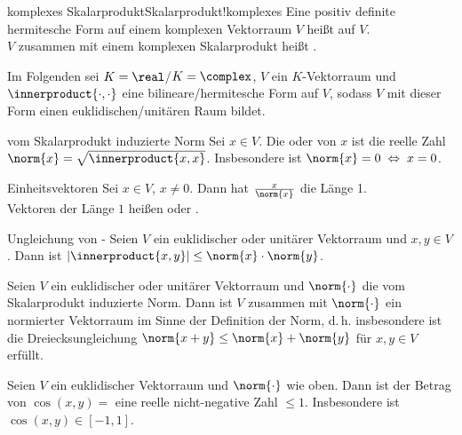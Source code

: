 \begin{xDef}{komplexes Skalarprodukt}{Skalarprodukt!komplexes}
    Eine positiv definite hermitesche Form auf einem komplexen Vektorraum $V$
    heißt 
    auf $V$. \\
    $V$ zusammen mit einem komplexen Skalarprodukt heißt
    .
\end{xDef}

\begin{Bem}
    Im Folgenden sei $K = \real$/$K= \complex$, $V$ ein $K$-Vektorraum
    und $\innerproduct{\cdot, \cdot}$ eine bilineare/hermitesche Form auf $V$,
    sodass $V$ mit dieser Form einen euklidischen/unitären Raum bildet.
\end{Bem}

\begin{Def}{vom Skalarprodukt induzierte Norm}
    Sei $x \in V$.
    Die  oder  von $x$ ist die reelle Zahl
    $\norm{x} = \sqrt{\innerproduct{x, x}}$.
    Insbesondere ist $\norm{x} = 0 \;\Leftrightarrow\; x = 0$.
\end{Def}

\begin{Def}{Einheitsvektoren}
    Sei $x \in V$, $x \not= 0$.
    Dann hat $\frac{x}{\norm{x}}$ die Länge 1. \\
    Vektoren der Länge $1$ heißen  oder
    .
\end{Def}

\begin{Satz}{Ungleichung von -}
    Seien $V$ ein euklidischer oder unitärer Vektorraum und $x, y \in V$.
    Dann ist $|\innerproduct{x, y}| \le \norm{x} \cdot \norm{y}$.
\end{Satz}

\begin{Kor}
    Seien $V$ ein euklidischer oder unitärer Vektorraum und $\norm{\cdot}$
    die vom Skalarprodukt induzierte Norm.
    Dann ist $V$ zusammen mit $\norm{\cdot}$ ein normierter Vektorraum
    im Sinne der Definition der Norm, d.\,h. insbesondere ist
    die Dreiecksungleichung $\norm{x + y} \le \norm{x} + \norm{y}$ für
    $x, y \in V$ erfüllt.
\end{Kor}

\begin{Kor}
    Seien $V$ ein euklidischer Vektorraum und $\norm{\cdot}$ wie oben.
    Dann ist der Betrag von
    $\cos(x, y) =$ 
    eine reelle nicht-negative Zahl $\le 1$.
    Insbesondere ist $\cos(x, y) \in [-1, 1]$.
\end{Kor}

